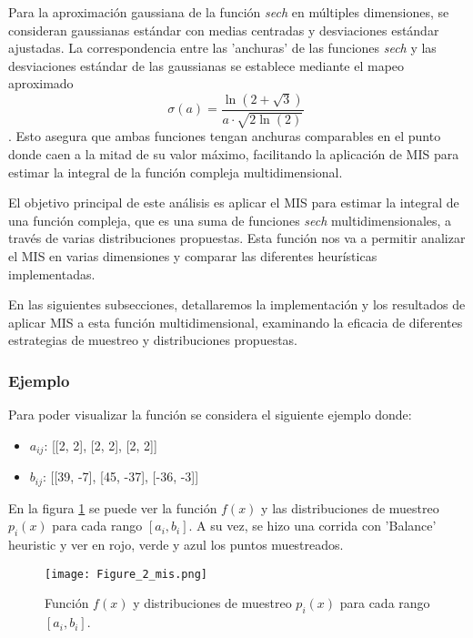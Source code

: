 \documentclass{article}
\begin{document}
Para la aproximación gaussiana de la función \textit{sech} en múltiples dimensiones, se consideran gaussianas estándar con medias centradas y desviaciones estándar ajustadas.
La correspondencia entre las 'anchuras' de las funciones \textit{sech} y las desviaciones estándar de las gaussianas se establece mediante el mapeo aproximado $$ \sigma(a) = \frac{\ln(2 + \sqrt{3})}{a \cdot \sqrt{2\ln(2)}} \ $$.
Esto asegura que ambas funciones tengan anchuras comparables en el punto donde caen a la mitad de su valor máximo, facilitando la aplicación de MIS para estimar la integral de la función compleja multidimensional.


El objetivo principal de este análisis es aplicar el MIS para estimar la integral de una función compleja, que es una suma de funciones \textit{sech} multidimensionales, a través de varias distribuciones propuestas.
Esta función nos va a permitir analizar el MIS en varias dimensiones y comparar las diferentes heurísticas implementadas.

En las siguientes subsecciones, detallaremos la implementación y los resultados de aplicar MIS a esta función multidimensional, examinando la eficacia de diferentes estrategias de muestreo y distribuciones propuestas.

\subsubsection{Ejemplo}

Para poder visualizar la función se considera el siguiente ejemplo donde:

\begin{itemize}
    \item \textbf{\( a_{ij} \)}: [[2, 2], [2, 2], [2, 2]]
    \item \textbf{\( b_{ij} \)}: [[39, -7], [45, -37], [-36, -3]]
\end{itemize}

En la figura \ref{fig:mis2} se puede ver la función \( f(x) \) y las distribuciones de muestreo \( p_{i}(x) \) para cada rango \( [a_{i}, b_{i}] \).
A su vez, se hizo una corrida con 'Balance' heuristic y ver en rojo, verde y azul los puntos muestreados.

\begin{figure}[H]
\texttt{[image: Figure\_2\_mis.png]}
\caption{Función \( f(x) \) y distribuciones de muestreo \( p_{i}(x) \) para cada rango \( [a_{i}, b_{i}] \).}
\label{fig:mis2}
\end{figure}
\end{document}
